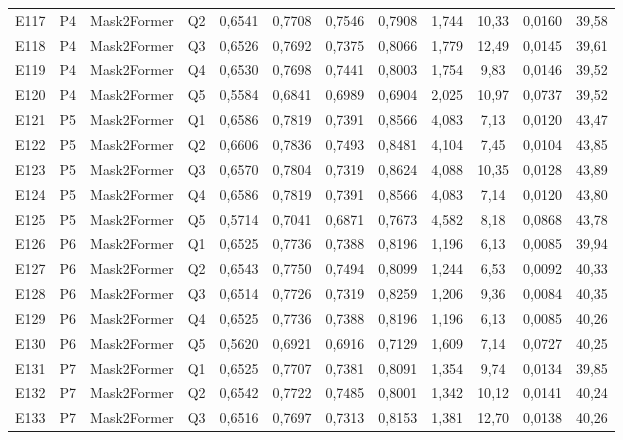 \begin{longtable}{lllllccccccc}
E117 & P4 & Mask2Former & Q2 & 0{,}6541 & 0{,}7708 & 0{,}7546 & 0{,}7908 & 1{,}744 & 10{,}33 & 0{,}0160 & 39{,}58 \\
E118 & P4 & Mask2Former & Q3 & 0{,}6526 & 0{,}7692 & 0{,}7375 & 0{,}8066 & 1{,}779 & 12{,}49 & 0{,}0145 & 39{,}61 \\
E119 & P4 & Mask2Former & Q4 & 0{,}6530 & 0{,}7698 & 0{,}7441 & 0{,}8003 & 1{,}754 & 9{,}83 & 0{,}0146 & 39{,}52 \\
E120 & P4 & Mask2Former & Q5 & 0{,}5584 & 0{,}6841 & 0{,}6989 & 0{,}6904 & 2{,}025 & 10{,}97 & 0{,}0737 & 39{,}52 \\
E121 & P5 & Mask2Former & Q1 & 0{,}6586 & 0{,}7819 & 0{,}7391 & 0{,}8566 & 4{,}083 & 7{,}13 & 0{,}0120 & 43{,}47 \\
E122 & P5 & Mask2Former & Q2 & 0{,}6606 & 0{,}7836 & 0{,}7493 & 0{,}8481 & 4{,}104 & 7{,}45 & 0{,}0104 & 43{,}85 \\
E123 & P5 & Mask2Former & Q3 & 0{,}6570 & 0{,}7804 & 0{,}7319 & 0{,}8624 & 4{,}088 & 10{,}35 & 0{,}0128 & 43{,}89 \\
E124 & P5 & Mask2Former & Q4 & 0{,}6586 & 0{,}7819 & 0{,}7391 & 0{,}8566 & 4{,}083 & 7{,}14 & 0{,}0120 & 43{,}80 \\
E125 & P5 & Mask2Former & Q5 & 0{,}5714 & 0{,}7041 & 0{,}6871 & 0{,}7673 & 4{,}582 & 8{,}18 & 0{,}0868 & 43{,}78 \\
E126 & P6 & Mask2Former & Q1 & 0{,}6525 & 0{,}7736 & 0{,}7388 & 0{,}8196 & 1{,}196 & 6{,}13 & 0{,}0085 & 39{,}94 \\
E127 & P6 & Mask2Former & Q2 & 0{,}6543 & 0{,}7750 & 0{,}7494 & 0{,}8099 & 1{,}244 & 6{,}53 & 0{,}0092 & 40{,}33 \\
E128 & P6 & Mask2Former & Q3 & 0{,}6514 & 0{,}7726 & 0{,}7319 & 0{,}8259 & 1{,}206 & 9{,}36 & 0{,}0084 & 40{,}35 \\
E129 & P6 & Mask2Former & Q4 & 0{,}6525 & 0{,}7736 & 0{,}7388 & 0{,}8196 & 1{,}196 & 6{,}13 & 0{,}0085 & 40{,}26 \\
E130 & P6 & Mask2Former & Q5 & 0{,}5620 & 0{,}6921 & 0{,}6916 & 0{,}7129 & 1{,}609 & 7{,}14 & 0{,}0727 & 40{,}25 \\
E131 & P7 & Mask2Former & Q1 & 0{,}6525 & 0{,}7707 & 0{,}7381 & 0{,}8091 & 1{,}354 & 9{,}74 & 0{,}0134 & 39{,}85 \\
E132 & P7 & Mask2Former & Q2 & 0{,}6542 & 0{,}7722 & 0{,}7485 & 0{,}8001 & 1{,}342 & 10{,}12 & 0{,}0141 & 40{,}24 \\
E133 & P7 & Mask2Former & Q3 & 0{,}6516 & 0{,}7697 & 0{,}7313 & 0{,}8153 & 1{,}381 & 12{,}70 & 0{,}0138 & 40{,}26 \\

\end{longtable}
